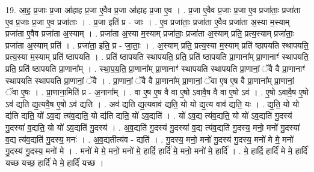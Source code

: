 \documentclass[17pt]{extarticle}
\begin{document}
19. आ॒ह॒ प्र॒जाः प्र॒जा आ॑हाह प्र॒जा ए॒वैव प्र॒जा आ॑हाह प्र॒जा ए॒व । . प्र॒जा ए॒वैव प्र॒जाः प्र॒जा ए॒व प्रजा॑ताः॒ प्रजा॑ता ए॒व प्र॒जाः प्र॒जा ए॒व प्रजा॑ताः । . प्र॒जा इति॑ प्र - जाः । . ए॒व प्रजा॑ताः॒ प्रजा॑ता ए॒वैव प्रजा॑ता अ॒स्या म॒स्याम् प्रजा॑ता ए॒वैव प्रजा॑ता अ॒स्याम् । . प्रजा॑ता अ॒स्या म॒स्याम् प्रजा॑ताः॒ प्रजा॑ता अ॒स्याम् प्रति॒ प्रत्य॒स्याम् प्रजा॑ताः॒ प्रजा॑ता अ॒स्याम् प्रति॑ । . प्रजा॑ता॒ इति॒ प्र - जा॒ताः॒ । . अ॒स्याम् प्रति॒ प्रत्य॒स्या म॒स्याम् प्रति॑ ष्ठापयति स्थापयति॒ प्रत्य॒स्या म॒स्याम् प्रति॑ ष्ठापयति । . प्रति॑ ष्ठापयति स्थापयति॒ प्रति॒ प्रति॑ ष्ठापयति प्रा॒णाना᳚म् प्रा॒णानाꣳ॑ स्थापयति॒ प्रति॒ प्रति॑ ष्ठापयति प्रा॒णाना᳚म् । . स्था॒प॒य॒ति॒ प्रा॒णाना᳚म् प्रा॒णानाꣳ॑ स्थापयति स्थापयति प्रा॒णानां॒ ॅवै वै प्रा॒णानाꣳ॑ स्थापयति स्थापयति प्रा॒णानां॒ ॅवै । . प्रा॒णानां॒ ॅवै वै प्रा॒णाना᳚म् प्रा॒णानां॒ ॅवा ए॒ष ए॒ष वै प्रा॒णाना᳚म् प्रा॒णानां॒ ॅवा ए॒षः । . प्रा॒णाना॒मिति॑ प्र - अ॒नाना᳚म् । . वा ए॒ष ए॒ष वै वा ए॒षो ऽवावै॒ष वै वा ए॒षो ऽव॑ । . ए॒षो ऽवावै॒ष ए॒षो ऽव॑ द्यति द्य॒त्यवै॒ष ए॒षो ऽव॑ द्यति । . अव॑ द्यति द्य॒त्यवाव॑ द्यति॒ यो यो द्य॒त्य वाव॑ द्यति॒ यः । . द्य॒ति॒ यो यो द्य॑ति द्यति॒ यो॑ ऽव॒द्य त्य॑व॒द्यति॒ यो द्य॑ति द्यति॒ यो॑ ऽव॒द्यति॑ । . यो॑ ऽव॒द्य त्य॑व॒द्यति॒ यो यो॑ ऽव॒द्यति॑ गु॒दस्य॑ गु॒दस्या॑ व॒द्यति॒ यो यो॑ ऽव॒द्यति॑ गु॒दस्य॑ । . अ॒व॒द्यति॑ गु॒दस्य॑ गु॒दस्या॑ व॒द्य त्य॑व॒द्यति॑ गु॒दस्य॒ मनो॒ मनो॑ गु॒दस्या॑ व॒द्य त्य॑व॒द्यति॑ गु॒दस्य॒ मनः॑ । . अ॒व॒द्यतीत्य॑व - द्यति॑ । . गु॒दस्य॒ मनो॒ मनो॑ गु॒दस्य॑ गु॒दस्य॒ मनो॑ मे मे॒ मनो॑ गु॒दस्य॑ गु॒दस्य॒ मनो॑ मे । . मनो॑ मे मे॒ मनो॒ मनो॑ मे॒ हार्दि॒ हार्दि॑ मे॒ मनो॒ मनो॑ मे॒ हार्दि॑ । . मे॒ हार्दि॒ हार्दि॑ मे मे॒ हार्दि॑ यच्छ यच्छ॒ हार्दि॑ मे मे॒ हार्दि॑ यच्छ । \newline
\end{document}
